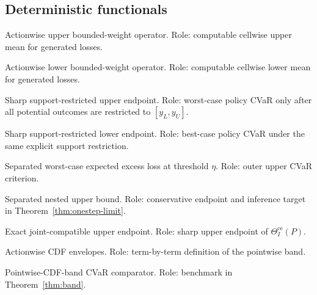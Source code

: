 \documentclass[11pt]{article}
\theoremstyle{definition}
\theoremstyle{plain}
\theoremstyle{remark}
\begin{document}
\subsection*{Deterministic functionals}
\begin{description}[leftmargin=4.1cm,style=sameline]
\item[\(\mathfrak T_\Gamma^{+}\)] Actionwise upper bounded-weight operator.
Role: computable cellwise upper mean for generated losses.
\item[\(\mathfrak T_\Gamma^{-}\)] Actionwise lower bounded-weight operator.
Role: computable cellwise lower mean for generated losses.
\item[\(\theta_U^{\mathrm{bd}}\)] Sharp support-restricted upper endpoint.
Role: worst-case policy CVaR only after all potential outcomes are restricted
to \([y_L,y_U]\).
\item[\(\theta_L^{\mathrm{bd}}\)] Sharp support-restricted lower endpoint.
Role: best-case policy CVaR under the same explicit support restriction.
\item[\(\Psi_\eta^{+,\mathrm{sep}}\)] Separated worst-case expected excess loss
at threshold \(\eta\).  Role: outer upper CVaR criterion.
\item[\(\underline W_{\tau,\Gamma}^{\mathrm{sep}}\)] Separated nested upper
bound.  Role: conservative endpoint and inference target in
Theorem~\ref{thm:onestep-limit}.
\item[\(\theta_U^{\mathrm{jnt}}\)] Exact joint-compatible upper endpoint.  Role:
sharp upper endpoint of \(\Theta_I^{\mathrm{ce}}(P)\).
\item[\(\mathfrak F_\Gamma^{-},\mathfrak F_\Gamma^{+}\)] Actionwise CDF
envelopes.  Role: term-by-term definition of the pointwise band.
\item[\(W_{\tau,\Gamma}^{\mathrm{band}}\)] Pointwise-CDF-band CVaR comparator.
Role: benchmark in Theorem~\ref{thm:band}.
\end{description}
\end{document}
